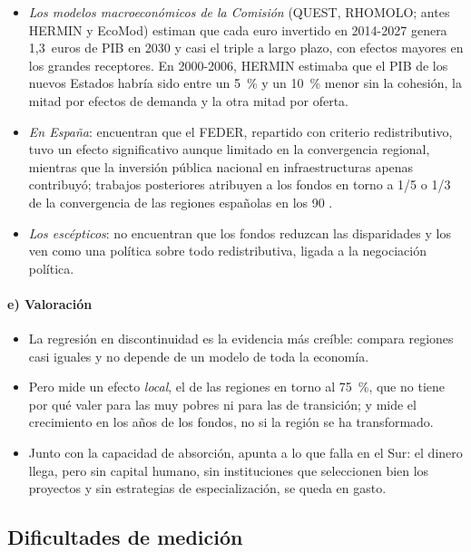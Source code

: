 \documentclass[11pt]{article}
\begin{document}
\begin{itemize}
\item \emph{Los modelos macroeconómicos de la Comisión} (QUEST, RHOMOLO; antes HERMIN y EcoMod) estiman que cada euro invertido en 2014-2027 genera 1,3~euros de PIB en 2030 y casi el triple a largo plazo, con efectos mayores en los grandes receptores\nocite{CE2024Informe9}. En 2000-2006, HERMIN estimaba que el PIB de los nuevos Estados habría sido entre un 5~\% y un 10~\% menor sin la cohesión, la mitad por efectos de demanda y la otra mitad por oferta.
\item \emph{En España}: \textcite{delaFuenteVives1995} encuentran que el FEDER, repartido con criterio redistributivo, tuvo un efecto significativo aunque limitado en la convergencia regional, mientras que la inversión pública nacional en infraestructuras apenas contribuyó; trabajos posteriores atribuyen a los fondos en torno a 1/5 o 1/3 de la convergencia de las regiones españolas en los 90 .
\item \emph{Los escépticos}: \textcite{BoldrinCanova2001} no encuentran que los fondos reduzcan las disparidades y los ven como una política sobre todo redistributiva, ligada a la negociación política.
\end{itemize}

\paragraph{e) Valoración}

\begin{itemize}
\item La regresión en discontinuidad es la evidencia más creíble: compara regiones casi iguales y no depende de un modelo de toda la economía.
\item Pero mide un efecto \emph{local}, el de las regiones en torno al 75~\%, que no tiene por qué valer para las muy pobres ni para las de transición; y mide el crecimiento en los años de los fondos, no si la región se ha transformado.
\item Junto con la capacidad de absorción, apunta a lo que falla en el Sur: el dinero llega, pero sin capital humano, sin instituciones que seleccionen bien los proyectos y sin estrategias de especialización, se queda en gasto.
\end{itemize}

\subsection{Dificultades de medición}\label{sec:medicion}
\end{document}

